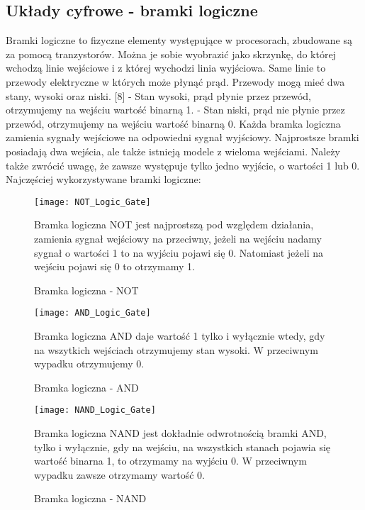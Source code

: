 \documentclass[12pt, a4paper, onside, polish]{article}				%
\begin{document}
\subsection{Układy cyfrowe - bramki logiczne}
\hspace{\parindent}
Bramki logiczne to fizyczne elementy występujące w procesorach, zbudowane są za pomocą tranzystorów. Można je sobie wyobrazić jako skrzynkę, do której wchodzą linie wejściowe i z której wychodzi linia wyjściowa. Same linie to przewody elektryczne w których może płynąć prąd. Przewody mogą mieć dwa stany, wysoki oraz niski. [8]
\newline\newline
- Stan wysoki, prąd płynie przez przewód, otrzymujemy na wejściu wartość binarną 1. 
\newline
- Stan niski, prąd nie płynie przez przewód, otrzymujemy na wejściu wartość binarną 0. 
\newline\newline
Każda bramka logiczna zamienia sygnały wejściowe na odpowiedni sygnał wyjściowy. Najprostsze bramki posiadają dwa wejścia, ale także istnieją modele z wieloma wejściami. Należy także zwrócić uwagę, że zawsze występuje tylko jedno wyjście, o wartości 1 lub 0. \newline\newline
Najczęściej wykorzystywane bramki logiczne: 
\newline

\begin{figure}[H]
{\centering \texttt{[image: NOT\_Logic\_Gate]} \caption{Bramka logiczna - NOT}}\vspace{5mm}
Bramka logiczna NOT jest najprostszą pod względem działania, zamienia sygnał wejściowy na przeciwny, jeżeli na wejściu nadamy sygnał o wartości 1 to na wyjściu pojawi się 0. Natomiast jeżeli na wejściu pojawi się 0 to otrzymamy 1. 
\end{figure}

\begin{figure}[H]
{\centering \texttt{[image: AND\_Logic\_Gate]} \caption{Bramka logiczna - AND}}\vspace{5mm}
Bramka logiczna AND daje wartość 1 tylko i wyłącznie wtedy, gdy na wszytkich wejściach otrzymujemy stan wysoki. W przeciwnym wypadku otrzymujemy 0.
\end{figure}

\begin{figure}[H]
{\centering \texttt{[image: NAND\_Logic\_Gate]} \caption{Bramka logiczna - NAND}}\vspace{5mm}
Bramka logiczna NAND jest dokładnie odwrotnością bramki AND, tylko i wyłącznie, gdy na wejściu, na wszystkich stanach pojawia się wartość binarna 1, to otrzymamy na wyjściu 0. W przeciwnym wypadku zawsze otrzymamy wartość 0. 
\end{figure}
\end{document}

